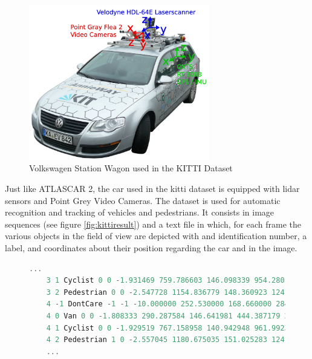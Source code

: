 \begin{figure}[htp]
	
	\centering
	\includegraphics[width=0.7\textwidth]{capstate/imgs/kitticar}
	
	\caption{Volkswagen Station Wagon used in the KITTI Dataset}
	\label{fig:kitticar}
	
\end{figure}

Just like ATLASCAR 2, the car used in the \gls{kitti} dataset is equipped with \gls{lidar} sensors and Point Grey Video Cameras. The dataset is used for automatic recognition and tracking of vehicles and pedestrians. It consists in image sequences (see figure \ref{fig:kittiresult}) and a text file in which, for each frame the various objects in the field of view are depicted with and identification number, a label, and coordinates about their position regarding the car and in the image. \cite{Geiger} 

\begin{figure}
\begin{center}
	\begin{lstlisting}[caption={KITTI dataset file snippet.}, language=c++, label={lst: pop_grid}]
	...
	3 1 Cyclist 0 0 -1.931469 759.786603 146.098339 954.280160 374.000000 1.739063 0.824591 1.785241 1.821119 1.569936 5.783265 -1.642450
	3 2 Pedestrian 0 0 -2.547728 1154.836779 148.360923 1241.000000 321.627088 1.714062 0.767881 0.972283 6.463579 1.474131 7.560739 -1.860031
	4 -1 DontCare -1 -1 -10.000000 252.530000 168.660000 284.460000 202.850000 -1000.000000 -1000.000000 -1000.000000 -10.000000 -1.000000 -1.000000 -1.000000
	4 0 Van 0 0 -1.808333 290.287584 146.641981 444.387179 269.473545 2.000000 1.823255 4.433886 -4.934786 1.601945 14.098646 -2.139796
	4 1 Cyclist 0 0 -1.929519 767.158958 140.942948 961.992360 374.000000 1.739063 0.824591 1.785241 1.881359 1.534695 5.785600 -1.631447
	4 2 Pedestrian 1 0 -2.557045 1180.675035 151.025283 1241.000000 325.015204 1.714062 0.767881 0.972283 6.516488 1.497786 7.267796 -1.846627
	...	\end{lstlisting}
\end{center}
\end{figure}

